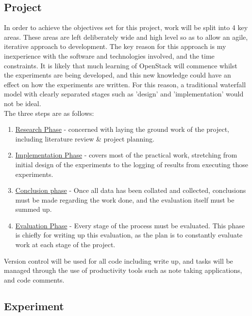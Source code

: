\subsection{Project}
In order to achieve the objectives set for this project, work will be split into 4 key areas. These areas are left deliberately wide and high level so as to allow an agile, iterative approach to development. The key reason for this approach is my inexperience with the software and technologies involved, and the time constraints. It is likely that much learning of OpenStack will commence whilst the experiments are being developed, and this new knowledge could have an effect on how the experiments are written. For this reason, a traditional waterfall model with clearly separated stages such as 'design' and 'implementation' would not be ideal. \\
The three steps are as follows:
\begin{enumerate}
\itemsep0em
\item \underline{Research Phase} - concerned with laying the ground work of the project, including literature review \& project planning.
\item \underline{Implementation Phase} - covers most of the practical work, stretching from initial design of the experiments to the logging of results from executing those experiments. 
\item \underline{Conclusion phase} - Once all data has been collated and collected, conclusions must be made regarding the work done, and the evaluation itself must be summed up.
\item \underline{Evaluation Phase} - Every stage of the process must be evaluated. This phase is chiefly for writing up this evaluation, as the plan is to constantly evaluate work at each stage of the project. 
\end{enumerate}  
Version control will be used for all code including write up, and tasks will be managed through the use of productivity tools such as note taking applications, and code comments. 

\subsection{Experiment}

